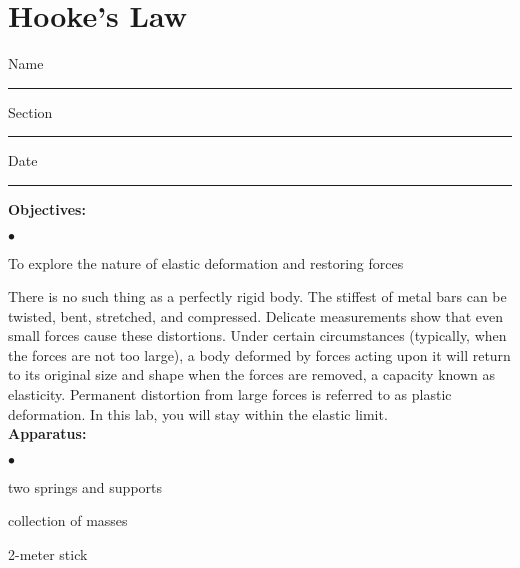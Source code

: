 
\section{Hooke's Law}

Name \rule{2.0in}{0.1pt}\hfill{}Section \rule{1.0in}{0.1pt}\hfill{}Date \rule{1.0in}{0.1pt}

{\noindent \bf Objectives:} \begin{list}{$\bullet$}{\itemsep0pt }

\item To explore the nature of elastic deformation and restoring forces

\end{list}


There is no such thing as a perfectly rigid body. The stiffest of metal bars can be twisted, bent, stretched, and compressed. Delicate measurements show that even small forces cause these distortions. Under certain circumstances (typically, when the forces are not too large), a body deformed by forces acting upon it will return to its original size and shape when the forces are removed, a capacity known as elasticity. Permanent distortion from large forces is referred to as plastic deformation. In this lab, you will stay within the elastic limit. \\

{\noindent \bf Apparatus:} \begin{list}{$\bullet$}{\itemsep0pt }

\item two springs and supports \item collection of masses \item 2-meter stick

\end{list}


